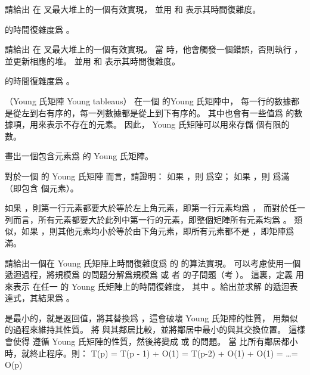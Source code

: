 \startitem
請給出  在  叉最大堆上的一個有效實現，
並用  和  表示其時間復雜度。

\startANSWER
{} 的時間復雜度爲 。
\stopANSWER
\stopitem

\startitem
請給出  在  叉最大堆上的一個有效實現。
當  時，他會觸發一個錯誤，否則執行 ，並更新相應的堆。
並用  和  表示其時間復雜度。

\startANSWER
{} 的時間復雜度爲 。
\stopANSWER
\stopitem
\stopigBase
\stopPROBLEM

\startPROBLEM
（Young 氏矩陣 Young tableaus）
在一個  的{\EMP Young 氏矩陣}中，
每一行的數據都是從左到右有序的，每一列數據都是從上到下有序的。
其中也會有一些值爲 \m{\infty} 的數據項，用來表示不存在的元素。
因此， Young 氏矩陣可以用來存儲  個有限的數。

\startigBase[a]
\startitem
畫出一個包含元素爲  的  Young 氏矩陣。

\startANSWER
\startformula\startpmatrix%
    \NR
{}   \NC \infty \NR
{}  \NC \infty \NC \infty \NR
\NC \infty \NC \infty \NC \infty \NC \infty \NR
\stoppmatrix\stopformula
\stopANSWER
\stopitem

\startitem
對於一個  的 Young 氏矩陣  而言，請證明：
如果 ，則  爲空；
如果 ，則  爲滿（即包含  個元素）。

\startANSWER
如果 ，則第一行元素都要大於等於左上角元素，即第一行元素均爲 \m{\infty}，
而對於任一列而言，所有元素都要大於此列中第一行的元素，即整個矩陣所有元素均爲 \m{\infty}。
類似，如果 ，則其他元素均小於等於由下角元素，即所有元素都不是 \m{\infty}，即矩陣爲滿。
\stopANSWER
\stopitem

\startitem
請給出一個在  Young 氏矩陣上時間復雜度爲  的  的算法實現。
可以考慮使用一個遞迴過程，將規模爲  的問題分解爲規模爲  或
者  的子問題（\hint 考 ）。
這裏，定義  用來表示  在任一  的 Young 氏矩陣上的時間復雜度，
其中 。給出並求解  的遞迴表達式，其結果爲 。

\startANSWER
{} 是最小的，就是返回值，將其替換爲 \m{\infty}，這會破壞 Young 氏矩陣的性質，
用類似  的過程來維持其性質。
將  與其鄰居比較，並將鄰居中最小的與其交換位置。
這樣會使得  遵循 Young 氏矩陣的性質，然後將變成  或  的問題。
當  比所有鄰居都小時，就終止程序。則：
\startformula
T(p) = T(p - 1) + O(1) = T(p-2) + O(1) + O(1) = \ldots = O(p)
\stopformula
\stopANSWER
\stopitem

